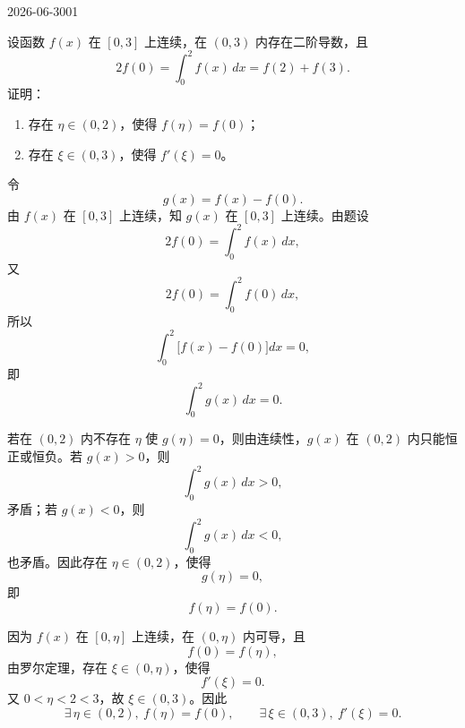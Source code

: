 \begin{mistake}{2026-06-30}{01}

\begin{problemcontent}
设函数 \(f(x)\) 在 \([0,3]\) 上连续，在 \((0,3)\) 内存在二阶导数，且
\[
2f(0)=\int_0^2 f(x)\,dx=f(2)+f(3).
\]
证明：
\begin{enumerate}
  \item 存在 \(\eta\in(0,2)\)，使得 \(f(\eta)=f(0)\)；
  \item 存在 \(\xi\in(0,3)\)，使得 \(f'(\xi)=0\)。
\end{enumerate}
\end{problemcontent}

\begin{solutioncontent}
令
\[
g(x)=f(x)-f(0).
\]
由 \(f(x)\) 在 \([0,3]\) 上连续，知 \(g(x)\) 在 \([0,3]\) 上连续。由题设
\[
2f(0)=\int_0^2 f(x)\,dx,
\]
又
\[
2f(0)=\int_0^2 f(0)\,dx,
\]
所以
\[
\int_0^2 \bigl[f(x)-f(0)\bigr]dx=0,
\]
即
\[
\int_0^2 g(x)\,dx=0.
\]

若在 \((0,2)\) 内不存在 \(\eta\) 使 \(g(\eta)=0\)，则由连续性，\(g(x)\) 在 \((0,2)\) 内只能恒正或恒负。若 \(g(x)>0\)，则
\[
\int_0^2 g(x)\,dx>0,
\]
矛盾；若 \(g(x)<0\)，则
\[
\int_0^2 g(x)\,dx<0,
\]
也矛盾。因此存在 \(\eta\in(0,2)\)，使得
\[
g(\eta)=0,
\]
即
\[
f(\eta)=f(0).
\]

因为 \(f(x)\) 在 \([0,\eta]\) 上连续，在 \((0,\eta)\) 内可导，且
\[
f(0)=f(\eta),
\]
由罗尔定理，存在 \(\xi\in(0,\eta)\)，使得
\[
f'(\xi)=0.
\]
又 \(0<\eta<2<3\)，故 \(\xi\in(0,3)\)。因此
\[
\exists\,\eta\in(0,2),\ f(\eta)=f(0),\qquad \exists\,\xi\in(0,3),\ f'(\xi)=0.
\]
\end{solutioncontent}


\end{mistake}
